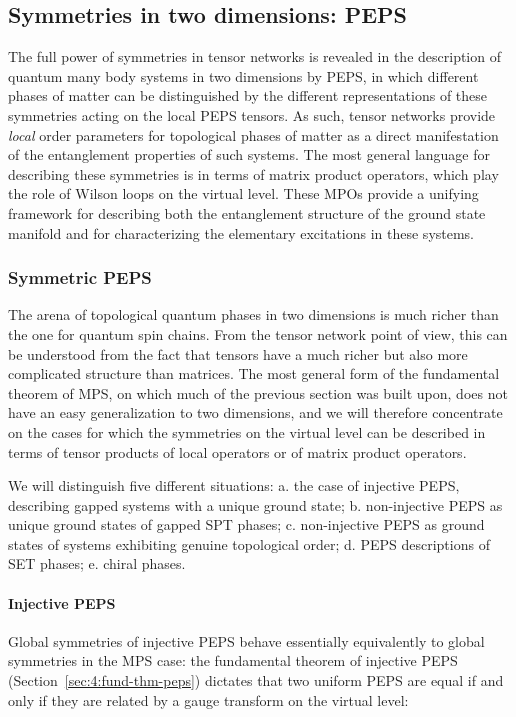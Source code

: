 \documentclass[rmp,aps,reprint,superscriptaddress,nobalancelastpage]{revtex4-1}
\begin{document}
\subsection{Symmetries in two dimensions: PEPS\label{sec:3:2D}}

The full power of symmetries in tensor networks is revealed in the description of quantum many body systems in two dimensions by PEPS, in which different  phases of matter can be distinguished by the different representations of these symmetries acting on  the local PEPS tensors. As such, tensor networks provide \emph{local} order parameters for topological phases of matter as a direct manifestation of the entanglement properties of such systems. The most general language for describing these symmetries is in terms of matrix product operators, which play the role of Wilson loops on the virtual level. These MPOs provide a unifying framework for describing both the entanglement structure of the ground state manifold and for characterizing the elementary excitations in these systems.

\subsubsection{Symmetric PEPS \label{sec:3:MPO-injective}\label{sec:3:2D-SPT}}

The arena of topological quantum phases in two dimensions is much richer than the one for quantum spin chains. From the tensor network point of view, this can be understood from the fact that tensors have a much richer but also more complicated structure than matrices. The most general form of the fundamental theorem of MPS, on which much of the previous section was built upon, does not have an easy generalization to two dimensions, and we will therefore concentrate on the cases for which the symmetries on the virtual level can be described in terms of tensor products of local operators or of matrix product operators.

We will distinguish five different situations: a. the case of injective PEPS, describing gapped systems with a unique ground state; b. non-injective PEPS as unique ground states of gapped SPT phases; c. non-injective PEPS as ground states of systems exhibiting genuine topological order; d. PEPS descriptions of SET phases; e. chiral phases.


\paragraph{Injective PEPS}
Global symmetries of injective PEPS behave essentially equivalently to global symmetries in the MPS case: the fundamental theorem of injective PEPS (Section~\ref{sec:4:fund-thm-peps}) dictates that two uniform PEPS are equal if and only if they are related by a gauge transform on the virtual level:
\end{document}
